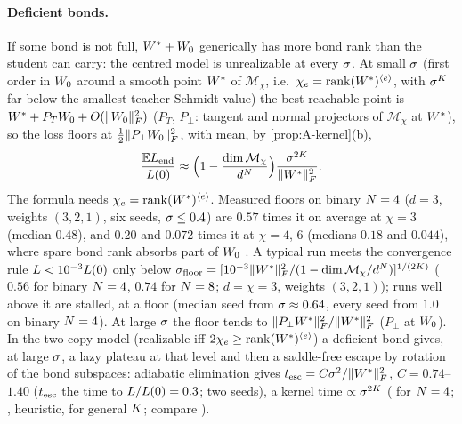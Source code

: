\paragraph{Deficient bonds.} \derived{} \newresult{} If some bond is not full, $W^{*}+W_{0}$ generically has more
bond rank than the student can carry: the centred model is unrealizable at every $\sigma$. At small $\sigma$
(first order in $W_{0}$ around a smooth point $W^{*}$ of $\mathcal M_\chi$, i.e.\ $\chi_{e}=\operatorname{rank}(W^{*})^{\langle e\rangle}$, with $\sigma^K$ far
below the smallest teacher Schmidt value) the best reachable point is $W^{*}+P_TW_{0}+O(\lVert W_{0}\rVert_{F}^2)$ ($P_T$,
$P_\perp$: tangent and normal projectors of $\mathcal M_\chi$ at $W^{*}$), so the loss floors at $\frac12\lVert P_\perp W_{0}\rVert_{F}^2$,
with mean, by \cref{prop:A-kernel}(b),
\begin{equation}\label{eq:A-centred-floor}
  \frac{\mathbb{E}L_{\rm end}}{L(0)}\approx\Big(1-\frac{\dim\mathcal M_\chi}{d^N}\Big)\frac{\sigma^{2K}}{\lVert W^{*}\rVert_{F}^2}.
\end{equation}
The formula needs $\chi_{e}=\operatorname{rank}(W^{*})^{\langle e\rangle}$. Measured floors on binary $N=4$ ($d=3$, weights $(3,2,1)$, six seeds,
$\sigma\le0.4$) are $0.57$ times it on average at $\chi=3$ (median $0.48$), and $0.20$ and $0.072$ times it at $\chi=4$,
$6$ (medians $0.18$ and $0.044$), where spare bond rank absorbs part of $W_{0}$ \empirical. A typical run meets the convergence rule
$L<10^{-3}L(0)$ only below
$\sigma_{\rm floor}=[10^{-3}\lVert W^{*}\rVert_{F}^2/(1-\dim\mathcal M_\chi/d^N)]^{1/(2K)}$ ($0.56$ for binary $N=4$, $0.74$ for $N=8$;
$d=\chi=3$, weights $(3,2,1)$); runs well above it are stalled, at a floor (median seed from $\sigma\approx0.64$,
every seed from $1.0$ on binary $N=4$). At large $\sigma$ the floor tends to
$\lVert P_\perp W^{*}\rVert_{F}^2/\lVert W^{*}\rVert_{F}^2$ ($P_\perp$ at $W_{0}$). In the two-copy model (realizable iff $2\chi_{e}\ge\operatorname{rank}(W^{*})^{\langle e\rangle}$) a
deficient bond gives, at large $\sigma$, a lazy plateau at that level and then a saddle-free escape by rotation
of the bond subspaces: adiabatic elimination gives $t_{\rm esc}=C\sigma^2/\lVert W^{*}\rVert_{F}^2$, $C=0.74$--$1.40$ ($t_{\rm esc}$ the
time to $L/L(0)=0.3$; two seeds), a kernel
time $\propto\sigma^{2K}$ (\derived{} for $N=4$; \conjecture{}, heuristic, for general $K$; compare
\citealp{tu2024mixed,lyu2024dichotomy}).

